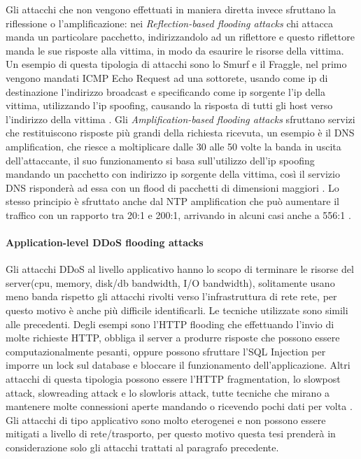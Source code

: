 Gli attacchi che non vengono effettuati in maniera diretta invece sfruttano la riflessione o l'amplificazione: nei \emph{Reflection-based flooding attacks} chi attacca manda un particolare pacchetto, indirizzandolo ad un riflettore e questo riflettore manda le sue risposte alla vittima, in modo da esaurire le risorse della vittima. Un esempio di questa tipologia di attacchi sono lo Smurf e il Fraggle, nel primo vengono mandati ICMP Echo Request ad una sottorete, usando come ip di destinazione l'indirizzo broadcast e specificando come ip sorgente l'ip della vittima, utilizzando l'ip spoofing, causando la risposta di tutti gli host verso l'indirizzo della vittima \cite{ddos_survey_2}.
Gli \emph{Amplification-based flooding attacks} sfruttano servizi che restituiscono risposte più grandi della richiesta ricevuta, un esempio è il DNS amplification, che riesce a moltiplicare dalle 30 alle 50 volte\cite{imperva_amplification} la banda in uscita dell'attaccante, il suo funzionamento si basa sull'utilizzo dell'ip spoofing mandando un pacchetto con indirizzo ip sorgente della vittima, così il servizio DNS risponderà ad essa con un flood di pacchetti di dimensioni maggiori \cite{ddos_survey_1}. Lo stesso principio è sfruttato anche dal NTP amplification che può aumentare il traffico con un rapporto tra 20:1 e 200:1, arrivando in alcuni casi anche a 556:1 \cite{imperva_amplification}. 


\paragraph{Application-level DDoS flooding attacks} %
Gli attacchi DDoS al livello applicativo hanno lo scopo di terminare le risorse del server(cpu, memory, disk/db bandwidth, I/O bandwidth),  solitamente usano meno banda rispetto gli attacchi rivolti verso l'infrastruttura di rete rete, per questo motivo è anche più difficile identificarli. Le tecniche utilizzate sono simili alle precedenti. Degli esempi sono l'HTTP flooding che effettuando l'invio di molte richieste HTTP, obbliga il server a produrre risposte che possono essere computazionalmente pesanti, oppure possono sfruttare l'SQL Injection per imporre un lock sul database e bloccare il funzionamento dell'applicazione. Altri attacchi di questa tipologia possono essere l'HTTP fragmentation, lo slowpost attack, slowreading attack e lo slowloris attack, tutte tecniche che mirano a mantenere molte connessioni aperte mandando o ricevendo pochi dati per volta \cite{ddos_survey_1}.
Gli attacchi di tipo applicativo sono molto eterogenei e non possono essere mitigati a livello di rete/trasporto, per questo motivo questa tesi prenderà in considerazione solo gli attacchi trattati al paragrafo precedente.

